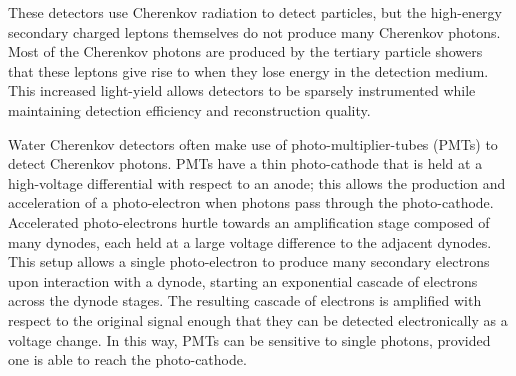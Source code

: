 These detectors use Cherenkov radiation to detect particles, but the high-energy secondary charged leptons themselves do not produce many Cherenkov photons.
Most of the Cherenkov photons are produced by the tertiary particle showers that these leptons give rise to when they lose energy in the detection medium.
This increased light-yield allows detectors to be sparsely instrumented while maintaining detection efficiency and reconstruction quality.

Water Cherenkov detectors often make use of photo-multiplier-tubes (PMTs) to detect Cherenkov photons.
PMTs have a thin photo-cathode that is held at a high-voltage differential with respect to an anode; this allows the production and acceleration of a photo-electron when photons pass through the photo-cathode.
Accelerated photo-electrons hurtle towards an amplification stage composed of many dynodes, each held at a large voltage difference to the adjacent dynodes.
This setup allows a single photo-electron to produce many secondary electrons upon interaction with a dynode, starting an exponential cascade of electrons across the dynode stages.
The resulting cascade of electrons is amplified with respect to the original signal enough that they can be detected electronically as a voltage change.
In this way, PMTs can be sensitive to single photons, provided one is able to reach the photo-cathode.